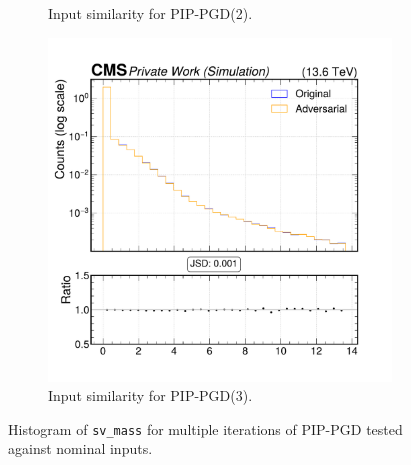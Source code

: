 \begin{figure}[htbp]
\begin{subfigure}[t]{0.32\textwidth}
    \caption*{Input similarity for PIP-PGD(2).}
  \end{subfigure}\hfill
  \begin{subfigure}[t]{0.32\textwidth}
    \includegraphics[width=\linewidth]{media/output/features/compare/combined_it_3/cmp_vtx_arr_sv_mass.pdf}
    \caption*{Input similarity for PIP-PGD(3).}
  \end{subfigure}

  \caption*{Histogram of \texttt{sv\_mass} for multiple iterations of PIP-PGD tested against nominal inputs.}
  \label{fig:combined_input_sv_mass}
\end{figure}

